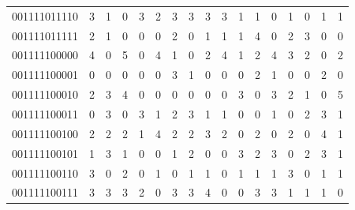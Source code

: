 \documentclass[10pt,a4paper]{article}
\begin{document}
\begin{longtable}{ |c|c|c|c|c|c|c|c|c|c|c|c|c|c|c|c|c| }
    001111011110              & 3                            & 1                                & 0                            & 3                              & 2   & 3   & 3   & 3   & 3   & 1   & 1   & 0   & 1   & 0   & 1   & 1   \\
    001111011111              & 2                            & 1                                & 0                            & 0                              & 0   & 2   & 0   & 1   & 1   & 1   & 4   & 0   & 2   & 3   & 0   & 0   \\
    001111100000              & 4                            & 0                                & 5                            & 0                              & 4   & 1   & 0   & 2   & 4   & 1   & 2   & 4   & 3   & 2   & 0   & 2   \\
    001111100001              & 0                            & 0                                & 0                            & 0                              & 0   & 3   & 1   & 0   & 0   & 0   & 2   & 1   & 0   & 0   & 2   & 0   \\
    001111100010              & 2                            & 3                                & 4                            & 0                              & 0   & 0   & 0   & 0   & 0   & 3   & 0   & 3   & 2   & 1   & 0   & 5   \\
    001111100011              & 0                            & 3                                & 0                            & 3                              & 1   & 2   & 3   & 1   & 1   & 0   & 0   & 1   & 0   & 2   & 3   & 1   \\
    001111100100              & 2                            & 2                                & 2                            & 1                              & 4   & 2   & 2   & 3   & 2   & 0   & 2   & 0   & 2   & 0   & 4   & 1   \\
    001111100101              & 1                            & 3                                & 1                            & 0                              & 0   & 1   & 2   & 0   & 0   & 3   & 2   & 3   & 0   & 2   & 3   & 1   \\
    001111100110              & 3                            & 0                                & 2                            & 0                              & 1   & 0   & 1   & 1   & 0   & 1   & 1   & 1   & 3   & 0   & 1   & 1   \\
    001111100111              & 3                            & 3                                & 3                            & 2                              & 0   & 3   & 3   & 4   & 0   & 0   & 3   & 3   & 1   & 1   & 1   & 0   \\

\end{longtable}
\end{document}
